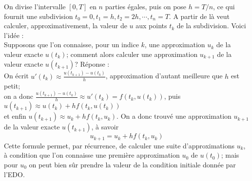 \documentclass{exam}
\begin{document}
\begin{questions}
On divise l'intervalle $[0, T]$ en $n$ parties égales, puis on pose $h=T/n$, ce qui fournit une subdivision $t_0 = 0, t_1 = h, t_2 = 2h, \cdots, t_n = T$. A partir de là veut calculer, approximativement, la valeur de $u$ aux points $t_k$ de la subdivision. Voici l'idée :\\
Supposons que l'on connaisse, pour un indice $k$, une approximation $u_k$ de la valeur exacte $u(t_k)$; comment alors calculer une approximation $u_{k+1}$ de la valeur exacte $u(t_{k+1})$? Réponse :\\
On écrit $u'(t_k) \approx \frac{u(t_{k+1})-u(t_k)}{h}$, approximation d'autant meilleure que $h$ est petit;\\
 on a donc 
 $\frac{u(t_{k+1})-u(t_k)}{h} \approx u'(t_k) = f(t_k, u(t_k))$, puis $u(t_{k+1}) \approx u(t_k) + hf(t_k, u(t_k))$\\
  et enfin 
  $u(t_{k+1}) \approx u_k + hf(t_k, u_k)$. On a donc trouvé une approximation $u_{k+1}$ de la valeur exacte $u(t_{k+1})$, à savoir 
$$u_{k+1} = u_k + hf(t_k, u_k)$$
Cette formule permet, par récurrence, de calculer une suite d'approximations $u_k$, à condition que l'on connaisse une première approximation $u_0$ de $u(t_0)$; mais pour $u_0$ on peut bien sûr prendre la valeur de la condition initiale donnée par l'EDO.

\end{questions}
\end{document}
